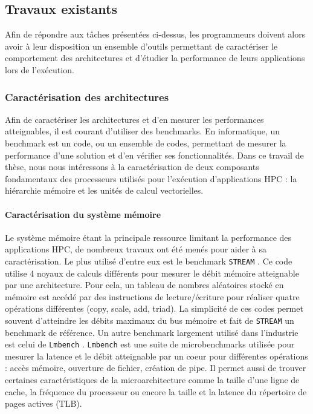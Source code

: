     \subsection{Travaux existants}
    
        Afin de répondre aux tâches présentées ci-dessus, les programmeurs doivent alors avoir à leur disposition un ensemble d'outils permettant de caractériser le comportement des architectures et d'étudier la performance de leurs applications lors de l'exécution.
        
        
        \subsubsection{Caractérisation des architectures}
            
            Afin de caractériser les architectures et d'en mesurer les performances atteignables, il est courant d'utiliser des \glspl{benchmark}. En informatique, un benchmark est un code, ou un ensemble de codes, permettant de mesurer la performance d'une solution et d'en vérifier ses fonctionnalités. Dans ce travail de thèse, nous nous intéressons à la caractérisation de deux composants fondamentaux des processeurs utilisés pour l'exécution d'applications \gls{HPC} : la hiérarchie mémoire et les unités de calcul vectorielles. 
            
            \paragraph{Caractérisation du système mémoire} 
            
                Le système mémoire étant la principale ressource limitant la performance des applications HPC, de nombreux travaux ont été menés pour aider à sa caractérisation. Le plus utilisé d'entre eux est le benchmark \verb|STREAM| \cite{McCalpin1995}. Ce code utilise 4 noyaux de calculs différents pour mesurer le débit mémoire atteignable par une architecture. Pour cela, un tableau de nombres aléatoires stocké en mémoire est accédé par des instructions de lecture/écriture pour réaliser quatre opérations différentes (copy, scale, add, triad). La simplicité de ces codes permet souvent d'atteindre les débits maximaux du bus mémoire et fait de \verb|STREAM| un benchmark de référence. Un autre benchmark largement utilisé dans l'industrie est celui de \verb|Lmbench| \cite{Staelin2004}. \verb|Lmbench| est une suite de microbenchmarks utilisée pour mesurer la latence et le débit atteignable par un coeur pour différentes opérations : accès mémoire, ouverture de fichier, création de pipe. Il permet aussi de trouver certaines caractéristiques de la microarchitecture comme la taille d'une ligne de cache, la fréquence du processeur ou encore la taille et la latence du répertoire de pages actives (TLB). 
                
